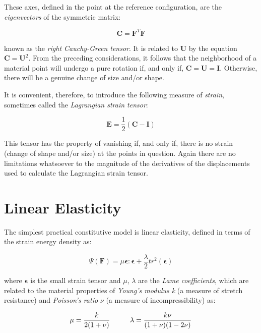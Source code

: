 These axes, defined in the point at the reference configuration, are the \textit{eigenvectors} of the symmetric matrix:

\begin{equation}
\mathbf{C} =  \mathbf{F}^T\mathbf{F}
\end{equation}

known as the \textit{right Cauchy-Green tensor}. It is related to $\textbf{U}$ by the equation $\mathbf{C}=\mathbf{U}^2$.
From the preceding considerations, it follows that the neighborhood of a material point will undergo a pure rotation if, 
and only if, $\mathbf{C}=\mathbf{U}=\mathbf{I}$. Otherwise, there will be a genuine change of size and/or shape. 


It is convenient, therefore, to introduce the following measure of \textit{strain}, sometimes called the \textit{Lagrangian 
strain tensor}: 


\begin{equation}
\mathbf{E} = \frac{1}{2}(\mathbf{C} - \mathbf{I})
\end{equation}

This tensor has the property of vanishing if, and only if, there is no strain (change of shape and/or size) at the points in question.
Again there are no limitations whatsoever to the magnitude of the derivatives of the displacements used to calculate the Lagrangian
strain tensor. 


\section{Linear Elasticity}
The simplest practical constitutive model is linear elasticity, defined in terms of the strain energy density as:

\begin{equation}
\label{eq:linearelasticity}
 \Psi(\mathbf{F}) = \mu\boldsymbol{\epsilon}:\boldsymbol{\epsilon} + \frac{\lambda}{2}tr^2(\boldsymbol{\epsilon})
\end{equation}

where $\boldsymbol{\epsilon}$ is the small strain tensor and $\mu$, $\lambda$ are the \textit{Lame coefficients}, which are related to
the material properties of \textit{Young's modulus k} (a measure of stretch resistance) and \textit{Poisson's ratio} $\nu$ (a 
measure of incompressibility) as:

\begin{align*}
\mu=\frac{k}{2(1+\nu)} \hspace{10 mm} \lambda=\frac{k\nu}{(1+\nu)(1-2\nu)}
\end{align*}

